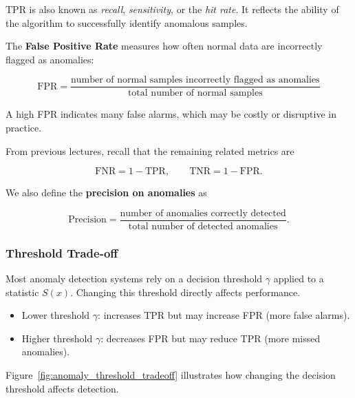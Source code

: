 \documentclass{article}
\begin{document}
TPR is also known as \emph{recall}, \emph{sensitivity}, or the \emph{hit rate}.
It reflects the ability of the algorithm to successfully identify anomalous
samples.

\hspace{4cm}

The \textbf{False Positive Rate} measures how often normal data are incorrectly
flagged as anomalies:

\begin{equation}
\text{FPR} = \frac{\text{number of normal samples incorrectly flagged as anomalies}}
{\text{total number of normal samples}}
\end{equation}

A high FPR indicates many false alarms, which may be costly or disruptive in
practice.

From previous lectures, recall that the remaining related metrics are

\[
\text{FNR} = 1 - \text{TPR}, \qquad
\text{TNR} = 1 - \text{FPR}.
\]

We also define the \textbf{precision on anomalies} as

\begin{equation}
\text{Precision} =
\frac{\text{number of anomalies correctly detected}}
{\text{total number of detected anomalies}}.
\end{equation}

\subsubsection{Threshold Trade-off}

Most anomaly detection systems rely on a decision threshold $\gamma$ applied to
a statistic $S(x)$. Changing this threshold directly affects performance.

\begin{itemize}
\item Lower threshold $\gamma$: increases TPR but may increase FPR
      (more false alarms).
\item Higher threshold $\gamma$: decreases FPR but may reduce TPR
      (more missed anomalies).
\end{itemize}

Figure~\ref{fig:anomaly_threshold_tradeoff} illustrates how changing the
decision threshold affects detection.
\end{document}
